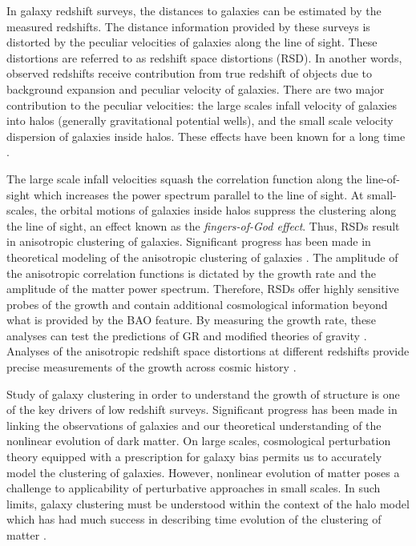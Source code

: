 In galaxy redshift surveys, the distances to galaxies can be estimated by the measured 
redshifts. The distance information provided by these surveys is distorted by the peculiar 
velocities of galaxies along the line of sight. These distortions are referred to as redshift space 
distortions (RSD). In another words, observed redshifts receive contribution from true redshift of 
objects due to background expansion and peculiar velocity of galaxies. There are two major contribution 
to the peculiar velocities: the large scales infall velocity of galaxies into halos (generally gravitational 
potential wells), and the small scale velocity dispersion of galaxies inside halos. These effects 
have been known for a long time \citep{jackson1972,kaiser1987}.

The large scale infall velocities squash the correlation function along the line-of-sight 
which increases the power spectrum parallel to the line of sight. At small-scales, the orbital motions 
of galaxies inside halos suppress the clustering along the line of sight, an effect known as the 
\emph{fingers-of-God effect}. Thus, RSDs result in anisotropic clustering of galaxies. Significant progress has 
been made in theoretical modeling of the anisotropic clustering of galaxies \citep{roman2004,percival2009,reid2011}. 
The amplitude of the anisotropic correlation functions is dictated by the growth rate and the amplitude of the 
matter power spectrum. Therefore, RSDs offer highly sensitive probes of the growth and contain additional cosmological information 
beyond what is provided by the BAO feature. By measuring the growth rate, these analyses can 
test the predictions of GR and modified theories of gravity \citep{linder2007,gong2008,Stril2010}. Analyses 
of the anisotropic redshift space distortions at different redshifts provide precise measurements 
of the growth across cosmic history \citep{chuang2013,beutler2014,sanchez2014,gill2017}. 

 
Study of galaxy clustering in order to understand the growth of structure is one of 
the key drivers of low redshift surveys. Significant progress has been made in linking the observations of 
galaxies and our theoretical understanding of the nonlinear evolution of dark matter. 
On large scales, cosmological perturbation theory equipped with a prescription for galaxy 
bias permits us to accurately model the clustering of galaxies. However, nonlinear evolution of matter 
poses a challenge to applicability of perturbative approaches in small scales. In such limits, 
galaxy clustering must be understood within the context of the halo model which has had 
much success in describing time evolution of the clustering of matter \citep{seljak2000,tinker_rsd2007,reid2014}.

